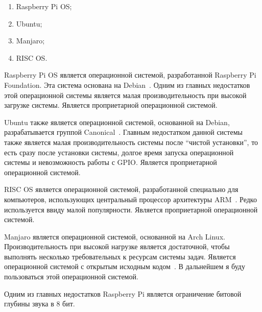 \begin{enumerate}
  \item Raspberry Pi OS;
  \item Ubuntu;
  \item Manjaro;
  \item RISC OS.
\end{enumerate}

Raspberry Pi OS является операционной системой, разработанной Raspberry Pi Foundation. Эта система основана на Debian~\cite{rpi-site}. Одним из главных недостатков этой операционной системы является малая производительность при высокой загрузке системы. Является проприетарной операционной системой.

Ubuntu также является операционной системой, основанной на Debian, разрабатывается группой Canonical~\cite{ubuntu}. Главным недостатком данной системы также является малая производительность системы после ``чистой установки'', то есть сразу после установки системы,  долгое время запуска операционной системы и невозможность работы с GPIO. Является проприетарной операционной системой.

RISC OS является операционной системой, разработанной специально для компьютеров, использующих центральный процессор архитектуры ARM~\cite{risc-os}. Редко используется ввиду малой популярности. Является проприетарной операционной системой.

Manjaro является операционной системой, основанной на Arch Linux. Производительность при высокой нагрузке является достаточной, чтобы выполнять несколько требовательных к ресурсам системы задач. Является операционной системой с открытым исходным кодом~\cite{manjaro}. В дальнейшем я буду пользоваться этой операционной системой.

Одним из главных недостатков Raspberry Pi является ограничение битовой глубины звука в 8 бит.
